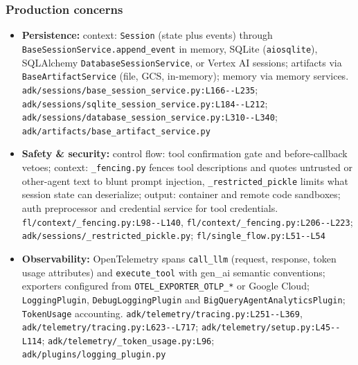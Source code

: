 \subsubsection*{Production concerns}
\begin{itemize}
\item \textbf{Persistence:} context: \texttt{Session} (state plus events) through \texttt{BaseSessionService.\allowbreak{}append\_\allowbreak{}event} in memory, SQLite (\texttt{aiosqlite}), SQLAlchemy \texttt{DatabaseSessionService}, or Vertex AI sessions; artifacts via \texttt{BaseArtifactService} (file, GCS, in-memory); memory via memory services. \texttt{adk/\allowbreak{}sessions/\allowbreak{}base\_\allowbreak{}session\_\allowbreak{}service.\allowbreak{}py:\allowbreak{}L166-\allowbreak{}-\allowbreak{}L235}; \texttt{adk/\allowbreak{}sessions/\allowbreak{}sqlite\_\allowbreak{}session\_\allowbreak{}service.\allowbreak{}py:\allowbreak{}L184-\allowbreak{}-\allowbreak{}L212}; \texttt{adk/\allowbreak{}sessions/\allowbreak{}database\_\allowbreak{}session\_\allowbreak{}service.\allowbreak{}py:\allowbreak{}L310-\allowbreak{}-\allowbreak{}L340}; \texttt{adk/\allowbreak{}artifacts/\allowbreak{}base\_\allowbreak{}artifact\_\allowbreak{}service.\allowbreak{}py}
\item \textbf{Safety \& security:} control flow: tool confirmation gate and before-callback vetoes; context: \texttt{\_\allowbreak{}fencing.\allowbreak{}py} fences tool descriptions and quotes untrusted or other-agent text to blunt prompt injection, \texttt{\_\allowbreak{}restricted\_\allowbreak{}pickle} limits what session state can deserialize; output: container and remote code sandboxes; auth preprocessor and credential service for tool credentials. \texttt{fl/\allowbreak{}context/\allowbreak{}\_\allowbreak{}fencing.\allowbreak{}py:\allowbreak{}L98-\allowbreak{}-\allowbreak{}L140}, \texttt{fl/\allowbreak{}context/\allowbreak{}\_\allowbreak{}fencing.\allowbreak{}py:\allowbreak{}L206-\allowbreak{}-\allowbreak{}L223}; \texttt{adk/\allowbreak{}sessions/\allowbreak{}\_\allowbreak{}restricted\_\allowbreak{}pickle.\allowbreak{}py}; \texttt{fl/\allowbreak{}single\_\allowbreak{}flow.\allowbreak{}py:\allowbreak{}L51-\allowbreak{}-\allowbreak{}L54}
\item \textbf{Observability:} OpenTelemetry spans \texttt{call\_\allowbreak{}llm} (request, response, token usage attributes) and \texttt{execute\_\allowbreak{}tool} with gen\_ai semantic conventions; exporters configured from \texttt{OTEL\_\allowbreak{}EXPORTER\_\allowbreak{}OTLP\_\allowbreak{}*} or Google Cloud; \texttt{LoggingPlugin}, \texttt{DebugLoggingPlugin} and \texttt{BigQueryAgentAnalyticsPlugin}; \texttt{TokenUsage} accounting. \texttt{adk/\allowbreak{}telemetry/\allowbreak{}tracing.\allowbreak{}py:\allowbreak{}L251-\allowbreak{}-\allowbreak{}L369}, \texttt{adk/\allowbreak{}telemetry/\allowbreak{}tracing.\allowbreak{}py:\allowbreak{}L623-\allowbreak{}-\allowbreak{}L717}; \texttt{adk/\allowbreak{}telemetry/\allowbreak{}setup.\allowbreak{}py:\allowbreak{}L45-\allowbreak{}-\allowbreak{}L114}; \texttt{adk/\allowbreak{}telemetry/\allowbreak{}\_\allowbreak{}token\_\allowbreak{}usage.\allowbreak{}py:\allowbreak{}L96}; \texttt{adk/\allowbreak{}plugins/\allowbreak{}logging\_\allowbreak{}plugin.\allowbreak{}py}

\end{itemize}
